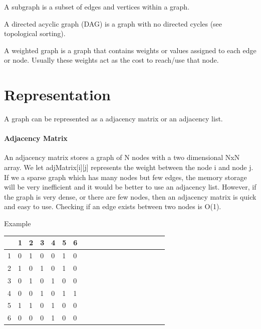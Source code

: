 \documentclass[11pt,oneside]{book}
\begin{document}
A subgraph is a subset of edges and vertices within a graph.

A directed acyclic graph (DAG) is a graph with no directed cycles (see topological sorting).

A weighted graph is a graph that contains weights or values assigned to each edge or node. Usually these weights act as the cost to reach/use that node.


    \chapter{ Representation }
        

A graph can be represented as a adjacency matrix or an adjacency list.

\subsubsection{Adjacency Matrix}



An adjacency matrix stores a graph of N nodes with a two dimensional NxN array. We let adjMatrix[i][j] represents the weight between the node i and node j. If we a sparse graph which has many nodes but few edges, the memory storage will be very inefficient and it would be better to use an adjacency list. However, if the graph is very dense, or there are few nodes, then an adjacency matrix is quick and easy to use. Checking if an edge exists between two nodes is O(1).

Example

\vspace{10px}\begin{tabulary}{0.4\linewidth}{|l|l|l|l|l|l|l|l|l|l|l|l|l|l|l|l|l|l|l}\hline


   &
  1 &
  2 &
  3 &
  4 &
  5 &
  6\\
\hline


  1 &
  0 &
  1 &
  0 &
  0 &
  1 &
  0\\

  2 &
  1 &
  0 &
  1 &
  0 &
  1 &
  0\\

  3 &
  0 &
  1 &
  0 &
  1 &
  0 &
  0\\

  4 &
  0 &
  0 &
  1 &
  0 &
  1 &
  1\\

  5 &
  1 &
  1 &
  0 &
  1 &
  0 &
  0\\

  6 &
  0 &
  0 &
  0 &
  1 &
  0 &
  0\\

\hline\end{tabulary}
\end{document}
